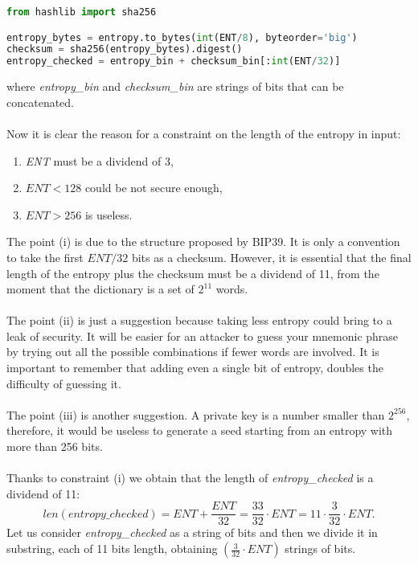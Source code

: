 \begin{lstlisting}[language=Python]
from hashlib import sha256

entropy_bytes = entropy.to_bytes(int(ENT/8), byteorder='big')
checksum = sha256(entropy_bytes).digest()
entropy_checked = entropy_bin + checksum_bin[:int(ENT/32)]
\end{lstlisting}
where \textit{entropy\_bin} and \textit{checksum\_bin} are strings of bits that can be concatenated.
\\ \\
Now it is clear the reason for a constraint on the length of the entropy in input: 
\begin{enumerate}[label=\roman*]
	\item \textit{ENT} must be a dividend of 3,
	\item $ENT<128$ could be not secure enough,
	\item $ENT>256$ is useless.
\end{enumerate}
The point (i) is due to the structure proposed by BIP39. It is only a convention to take the first $ENT/32$ bits as a checksum. However, it is essential that the final length of the entropy plus the checksum must be a dividend of 11, from the moment that the dictionary is a set of $2^{11}$ words.
\\ \\
The point (ii) is just a suggestion because taking less entropy could bring to a leak of security. It will be easier for an attacker to guess your mnemonic phrase by trying out all the possible combinations if fewer words are involved. It is important to remember that adding even a single bit of entropy, doubles the difficulty of guessing it.
\\ \\
The point (iii) is another suggestion. A private key is a number smaller than $2^{256}$, therefore, it would be useless to generate a seed starting from an entropy with more than 256 bits.
\\ \\
Thanks to constraint (i) we obtain that the length of \textit{entropy\_checked} is a dividend of 11:
\begin{equation*}
len(entropy\_checked)=ENT+\dfrac{ENT}{32}=\dfrac{33}{32}\cdot ENT=11\cdot \dfrac{3}{32}\cdot ENT.
\end{equation*}
Let us consider \textit{entropy\_checked} as a string of bits and then we divide it in substring, each of 11 bits length, obtaining $(\frac{3}{32}\cdot ENT)$ strings of bits.
\\ \\
